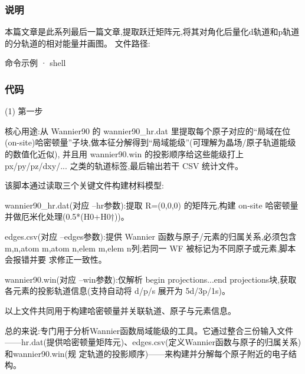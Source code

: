 \documentclass[lang=cn,scheme=chinese,color=blue,device=normal,toc=onecol,math=cm]{elegantbook}
\begin{document}
\subsubsection{说明}


本篇文章是此系列最后一篇文章,提取跃迁矩阵元,将其对角化后量化d轨道和p轨道的分轨道的相对能量并画图。 文件路径:\par


\begin{inlinecodebox}{命令示例 · shell}
\end{inlinecodebox}


\subsubsection{代码}


(1) 第一步\par


核心用途:从 Wannier90 的 wannier90\_\allowbreak{}hr.dat 里提取每个原子对应的“局域在位(on-site)哈密顿量”子块,做本征分解得到“局域能级”(可理解为晶场/\allowbreak{}原子轨道能级的数值化近似), 并且用 wannier90.win 的投影顺序给这些能级打上 px/\allowbreak{}py/\allowbreak{}pz/\allowbreak{}dxy/\allowbreak{}... 之类的轨道标签,最后输出若干 CSV 统计文件。\par


该脚本通过读取三个关键文件构建材料模型:\par


wannier90\_\allowbreak{}hr.dat(对应 –hr参数):提取 R=(0,0,0) 的矩阵元,构建 on‐site 哈密顿量并做厄米化处理(0.5*(H0+H0†))。\par


edges.csv(对应 –edges参数):提供 Wannier 函数与原子/\allowbreak{}元素的归属关系,必须包含 m,n,atom m,atom n,elem m,elem n列;若同一 WF 被标记为不同原子或元素,脚本会报错并要 求修正一致性。\par


wannier90.win(对应 –win参数):仅解析 begin projections...end projections块,获取各元素的投影轨道信息(支持自动将 d/\allowbreak{}p/\allowbreak{}s 展开为 5d/\allowbreak{}3p/\allowbreak{}1s)。\par


以上文件共同用于构建哈密顿量并关联轨道、原子与元素信息。\par


总的来说:专门用于分析Wannier函数局域能级的工具。它通过整合三份输入文件——hr.dat(提供哈密顿量矩阵元)、edges.csv(定义Wannier函数与原子的归属关系)和wannier90.win(规 定轨道的投影顺序)——来构建并分解每个原子附近的电子结构。\par
\end{document}
